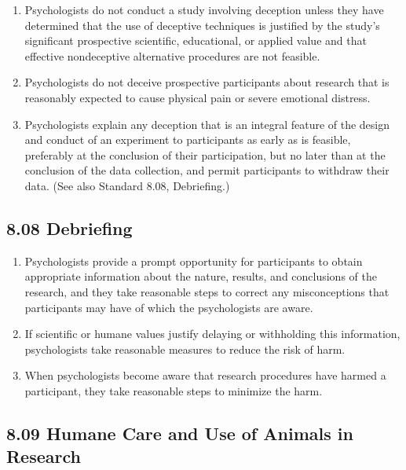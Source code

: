 \begin{enumerate}

\item Psychologists do not conduct a study involving deception unless they have determined that the use of
deceptive techniques is justified by the study's significant prospective scientific, educational, or applied value and that effective nondeceptive alternative procedures are not feasible.


\item Psychologists do not deceive prospective participants about research that is reasonably expected to cause physical pain or severe emotional distress.


\item Psychologists explain any deception that is an integral feature of the design and conduct of an experiment to participants as early as is feasible, preferably at the conclusion of their participation, but no later than at the conclusion of the data collection, and permit participants to withdraw their data. (See also Standard 8.08, Debriefing.)

\end{enumerate}


\subsection{8.08 Debriefing}

\begin{enumerate}

\item Psychologists provide a prompt opportunity for participants to obtain appropriate information about the nature, results, and conclusions of the research, and they take reasonable steps to correct any misconceptions that participants may have of which the psychologists are aware.

\item If scientific or humane values justify delaying or withholding this information, psychologists take reasonable measures to reduce the risk of harm.

\item When psychologists become aware that research procedures have harmed a participant, they take reasonable steps to minimize the harm.

\end{enumerate}


\subsection{8.09 Humane Care and Use of Animals in Research}

